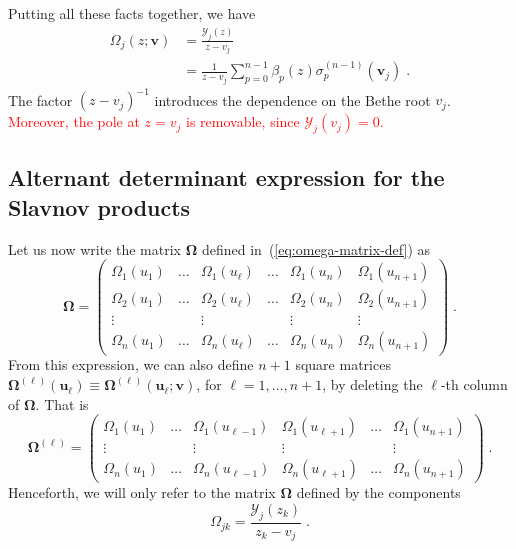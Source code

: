 \documentclass[a4paper,11pt]{amsart}
\begin{document}
Putting all these facts together, we have
\begin{equation}
\begin{split}
  \Omega_{j}(z; \bm{v}) & = \frac{\mathcal{Y}_j(z) }{z - v_j} \\ 
& = \frac{1}{z - v_j} \sum_{p=0}^{n-1} \beta_p(z) \sigma_p^{(n-1)}(\bm{v}_j) \; .
\end{split}
\end{equation}
The factor \((z - v_j)^{-1}\) introduces the dependence on the Bethe root \(v_j\).  
\textcolor{red}{Moreover, the pole at \(z = v_j\) is removable, since \(\mathcal{Y}_j(v_j)=0\).}

\subsection{Alternant determinant expression for the Slavnov products}

Let us now write the matrix \(\bm{\Omega}\) defined
in~(\ref{eq:omega-matrix-def}) as
\begin{equation}
  \bm{\Omega} =
  \begin{pmatrix}
    \Omega_1(u_1) & \dots & \Omega_1(u_\ell) & \dots  & \Omega_1(u_n) & \Omega_1(u_{n+1}) \\
    \Omega_2(u_1) & \dots & \Omega_2(u_\ell) & \dots  & \Omega_2(u_n) & \Omega_2(u_{n+1}) \\
          \vdots &       &   \vdots    &    &     \vdots       & \vdots   \\
    \Omega_n(u_1) & \dots & \Omega_n(u_\ell)& \dots  & \Omega_n(u_n) & \Omega_n(u_{n+1})
  \end{pmatrix}\; .
\end{equation}
From this expression, we can also define \(n+1\) square matrices
\(\bm\Omega^{(\ell)}(\bm{u}_\ell) \equiv \bm\Omega^{(\ell)}(\bm{u}_\ell; \bm{v})\), for
\(\ell = 1, \dots, n+1\), by deleting the \(\ell\)-th column of
\(\bm{\Omega}\). That is
\begin{equation}
  \bm{\Omega}^{(\ell)} =
  \begin{pmatrix}
    \Omega_1(u_1) & \dots & \Omega_1(u_{\ell-1}) & \Omega_1(u_{\ell+1})&\dots & \Omega_1(u_{n+1}) \\
    \vdots &  & \vdots & \vdots & & \vdots \\
    \Omega_n(u_1) & \dots & \Omega_n(u_{\ell-1}) & \Omega_n(u_{\ell+1})&\dots & \Omega_n(u_{n+1})
  \end{pmatrix}\; .
\end{equation}
Henceforth, we will only refer to the matrix
\(\bm{\Omega}\) defined by the components
\begin{equation}
  \label{eq:omega-matrix}
  \Omega_{jk} = \frac{\mathcal{Y}_j(z_k)}{z_k - v_j}\; .
\end{equation}
\end{document}
